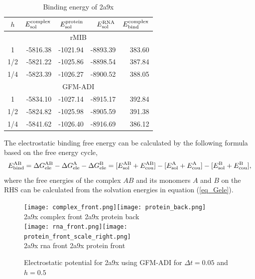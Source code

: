 \begin{table}[t!]
\centering
\begin{tabular}{crrrr}
\hline
$h$ & $E_{\rm sol}^{\rm complex}$ & $E_{\rm sol}^{\rm protein}$ & $E_{\rm sol}^{\rm RNA}$ & $E_{\rm bind}^{\rm complex}$ \\ \hline
\multicolumn{5}{c}{rMIB}  \\ \hline
1   & -5816.38 & -1021.94 & -8893.39 & 383.60 \\
1/2 & -5821.22 & -1025.86 & -8898.54 & 387.84 \\
1/4 & -5823.39 & -1026.27 & -8900.52 & 388.05 \\ \hline
\multicolumn{5}{c}{GFM-ADI}  				  \\ \hline
1   & -5834.10 & -1027.14 & -8915.17 & 392.84 \\
1/2 & -5824.82 & -1025.98 & -8905.59 & 391.38 \\
1/4 & -5841.62 & -1026.40 & -8916.69 & 386.12 \\ \hline
\end{tabular}
\caption{Binding energy of 2a9x}
\label{tab_2a9x}
\end{table}

The electrostatic binding free energy can be calculated by the following formula based on the free energy cycle,
\begin{equation}
	E^{\rm AB}_{\rm bind}=\Delta G^{\rm AB}_{\rm ele}-\Delta G^{\rm A}_{\rm ele}-\Delta G^{\rm B}_{\rm ele}\label{eq_bind} =[E^{\rm AB}_{\rm sol}+E^{\rm AB}_{\rm cou}]-[E^{\rm A}_{\rm sol}+E^{\rm A}_{\rm cou}]-[E^{\rm B}_{\rm sol}+E^{\rm B}_{\rm cou}],
\end{equation}
where the free energies of the complex $AB$ and its monomers $A$ and $B$ on the RHS can be calculated from the solvation energies in equation (\ref{eq_Gele}). 

\begin{figure}[!ht]
	\begin{center}
		\texttt{[image: complex\_front.png]}\texttt{[image: protein\_back.png]}\\
		\hskip 0.5in 2a9x complex front\hskip 2.5in 2a9x  protein back\\
		\texttt{[image: rna\_front.png]}\texttt{[image: protein\_front\_scale\_right.png]}\\
		\hskip 0.7in 2a9x rna front\hskip 2.8in 2a9x  protein front\\
		\caption{Electrostatic potential for 2a9x using GFM-ADI for $\Delta t = 0.05$ and $h = 0.5$}
		\label{fig:2a9x}
	\end{center}
\end{figure}


